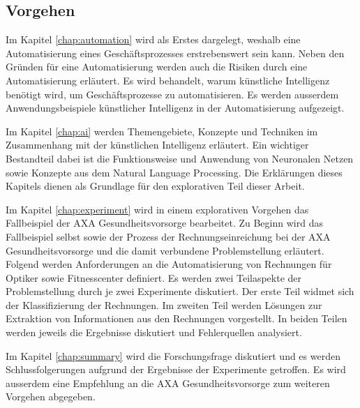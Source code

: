 


\subsection{Vorgehen}

Im Kapitel \ref{chap:automation} wird als Erstes dargelegt, weshalb eine Automatisierung eines Geschäftsprozesses erstrebenswert sein kann. Neben den Gründen für eine Automatisierung werden auch die Risiken durch eine Automatisierung erläutert. Es wird behandelt, warum künstliche Intelligenz benötigt wird, um Geschäftsprozesse zu automatisieren. Es werden ausserdem Anwendungsbeispiele künstlicher Intelligenz in der Automatisierung aufgezeigt.

Im Kapitel \ref{chap:ai} werden Themengebiete, Konzepte und Techniken im Zusammenhang mit der künstlichen Intelligenz erläutert. Ein wichtiger Bestandteil dabei ist die Funktionsweise und Anwendung von Neuronalen Netzen sowie Konzepte aus dem Natural Language Processing. Die Erklärungen dieses Kapitels dienen als Grundlage für den explorativen Teil dieser Arbeit.

Im Kapitel \ref{chap:experiment} wird in einem explorativen Vorgehen das Fallbeispiel der AXA Gesundheitsvorsorge bearbeitet. Zu Beginn wird das Fallbeispiel selbst sowie der Prozess der Rechnungseinreichung bei der AXA Gesundheitsvorsorge und die damit verbundene Problemstellung erläutert. Folgend werden Anforderungen an die Automatisierung von Rechnungen für Optiker sowie Fitnesscenter definiert. Es werden zwei Teilaspekte der Problemstellung durch je zwei Experimente diskutiert. Der erste Teil widmet sich der Klassifizierung der Rechnungen. Im zweiten Teil werden Lösungen zur Extraktion von Informationen aus den Rechnungen vorgestellt. In beiden Teilen werden jeweils die Ergebnisse diskutiert und Fehlerquellen analysiert. 

Im Kapitel \ref{chap:summary} wird die Forschungsfrage diskutiert und es werden Schlussfolgerungen aufgrund der Ergebnisse der Experimente getroffen. Es wird ausserdem eine Empfehlung an die AXA Gesundheitsvorsorge zum weiteren Vorgehen abgegeben.

